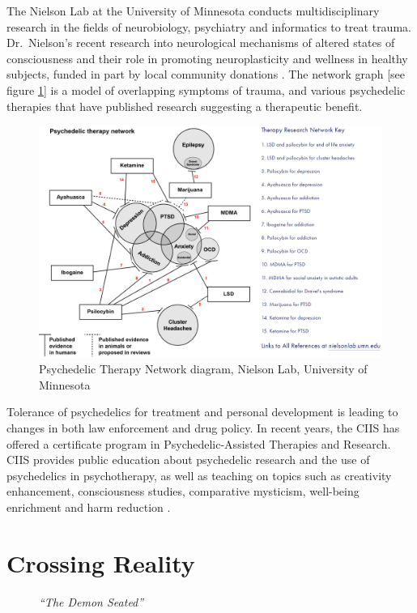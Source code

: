 \documentclass{UIdahoMastersThesis}
\begin{document}
The Nielson Lab at the University of Minnesota conducts multidisciplinary research in the fields of neurobiology, psychiatry and informatics to treat trauma. Dr.~Nielson's recent research into neurological mechanisms of altered states of consciousness and their role in promoting neuroplasticity and wellness in healthy subjects, funded in part by local community donations \cite{noauthor_nielson_nodate}. The network graph [see figure \ref{fig:therapy}] is a model of overlapping symptoms of trauma, and various psychedelic therapies that have published research suggesting a therapeutic benefit.

\begin{figure}
	\centering
	\includegraphics[width=\linewidth]{therapy.png}	
	\caption{Psychedelic Therapy Network diagram, Nielson Lab, University of Minnesota}
	\label{fig:therapy}
\end{figure}

Tolerance of psychedelics for treatment and personal development is leading to changes in both law enforcement and drug policy. In recent years, the \ac{CIIS} has offered a certificate program in Psychedelic-Assisted Therapies and Research. \ac{CIIS} provides public education about psychedelic research and the use of psychedelics in psychotherapy, as well as teaching on topics such as creativity enhancement, consciousness studies, comparative mysticism, well-being enrichment and harm reduction \cite{noauthor_ciis_nodate}.

\clearpage


\chapter{Crossing Reality}
\captionsetup{labelformat=empty}
\captionsetup{font=footnotesize}
\begin{figure}[h!]
	\centering
	\noindent
	{%
	\setlength{\fboxsep}{0pt}%
	\setlength{\fboxrule}{1.5pt}%
	}%
	\caption[Art by Mikhail Vrubel, ``The Demon Seated'', 1890]{\textit{``The Demon Seated''}} 
	\label{fig:ch4}
\end{figure}
\captionsetup{labelformat=simple}
\captionsetup{font=small,labelfont=bf}
\end{document}
